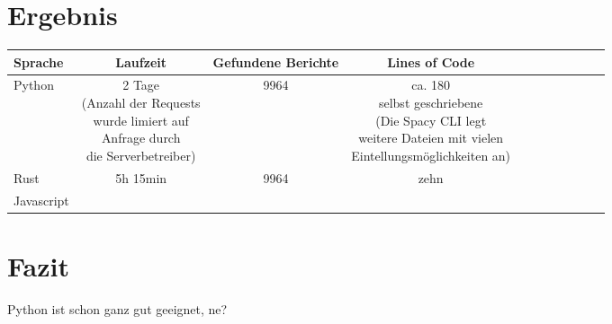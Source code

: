 \section{Ergebnis}

\begin{tabular}{| l | c | c | c | c | c | c | c | c | c | c |}
	\hline
	Sprache    & Laufzeit & Gefundene Berichte & Lines of Code\\
	\hline
	Python     & \makecell{2 Tage \\ (Anzahl der Requests \\ wurde limiert auf  \\ Anfrage durch \\ die Serverbetreiber)} & 9964 &  \makecell{ca. 180 \\ selbst geschriebene  \\ (Die Spacy CLI legt \\ weitere Dateien mit vielen \\ Eintellungsmöglichkeiten an)} \\
	\hline
	Rust       & 5h 15min & 9964 & zehn \\
	\hline
	Javascript & & &\\
	\hline
\end{tabular}

\section{Fazit}
Python ist schon ganz gut geeignet, ne?\\
